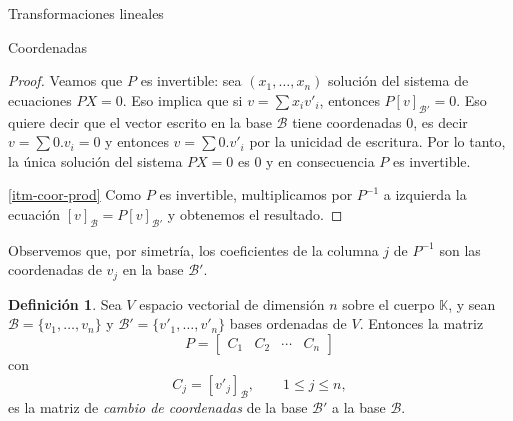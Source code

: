 \documentclass[a4paper,12pt,twoside,spanish,reqno]{amsbook}
\numberwithin{equation}{section}
\theoremstyle{definition}
\newtheorem{definicion}[teorema]{Definici\'on}
\theoremstyle{remark}
\newcommand{\K}{\mathbb K}
\begin{document}
\begin{chapter}{Transformaciones lineales}
\begin{section}{Coordenadas}
\begin{proof}
        Veamos que $P$  es invertible: sea $(x_1,\ldots,x_n)$ solución del sistema de ecuaciones $PX =0$. Eso implica que si $v =\sum x_i v'_i$,  entonces $P[v]_{\mathcal B'}=0$.     Eso quiere decir que el vector  escrito en la base $\mathcal B$ tiene coordenadas $0$,  es decir $v = \sum 0. v_i =0$ y entonces $v = \sum 0. v'_i$ por la unicidad de escritura. Por lo tanto, la única solución del sistema $PX=0$ es 0 y en consecuencia $P$  es invertible.
        
        \ref{itm-coor-prod}  Como $P$ es invertible, multiplicamos por $P^{-1}$  a izquierda la ecuación $[v]_\mathcal{B} = P[v]_\mathcal{B'}$ y obtenemos el resultado.
    \end{proof}

    Observemos que, por simetría,  los coeficientes de la columna $j$ de $P^{-1}$ son las coordenadas de $v_j$ en la base $\mathcal{B'}$. 
    
    \begin{definicion} 
        Sea $V$  espacio vectorial de dimensión $n$  sobre el cuerpo $\K$, 	y sean $\mathcal{B} = \{v_1,\ldots,v_n\}$ y $\mathcal{B'} = \{v'_1,\ldots,v'_n\}$ bases ordenadas de $V$. Entonces la matriz
        $$
        P = \begin{bmatrix}
         C_1 &C_2 &\cdots &C_n
        \end{bmatrix}
        $$
        con 
        $$
            C_j = [v'_j]_\mathcal{B},\qquad 1 \le j \le n,
        $$
        es la matriz de \textit{cambio de coordenadas} de la base $\mathcal{B'}$  a la base $\mathcal{B}$.
    \end{definicion}
    

\end{section}
\end{chapter}
\end{document}
